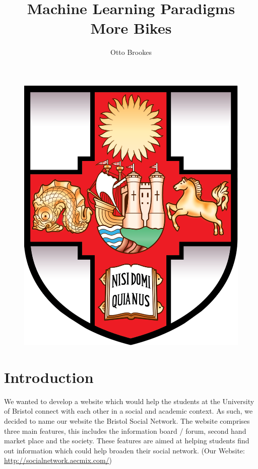 \documentclass[a4paper]{article}
\begin{document}
\title{Machine Learning Paradigms\\ More Bikes}
\vspace{11mm}
\begin{figure}
    \centering
    \includegraphics[scale=0.6]{Logo/UoB_crest.png}
\end{figure}
\author{Otto Brookes}
\maketitle
\newpage


\section{Introduction} \label{sec:intro}

We wanted to develop a website which would help the students at the University of Bristol connect with each other in a social and academic context. As such, we decided to name our website the Bristol Social Network. The website comprises three main features, this includes the information board / forum, second hand market place and the society. These features are aimed at helping students find out information which could help broaden their social network. (Our Website: \url{ http://socialnetwork.aecmix.com/})
\end{document}
